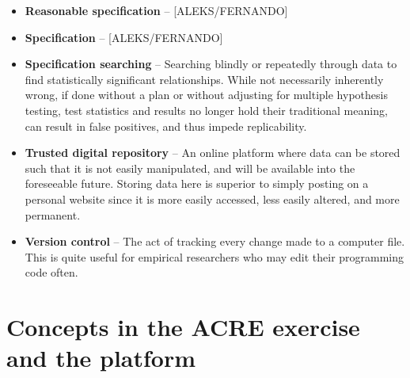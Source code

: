 \documentclass[]{book}
\begin{document}
\begin{itemize}
\item
  \textbf{Reasonable specification} -- {[}ALEKS/FERNANDO{]}
\item
  \textbf{Specification} -- {[}ALEKS/FERNANDO{]}
\item
  \textbf{Specification searching} -- Searching blindly or repeatedly through data to find statistically significant relationships. While not necessarily inherently wrong, if done without a plan or without adjusting for multiple hypothesis testing, test statistics and results no longer hold their traditional meaning, can result in false positives, and thus impede replicability.\\
\item
  \textbf{Trusted digital repository} -- An online platform where data can be stored such that it is not easily manipulated, and will be available into the foreseeable future. Storing data here is superior to simply posting on a personal website since it is more easily accessed, less easily altered, and more permanent.\\
\item
  \textbf{Version control} -- The act of tracking every change made to a computer file. This is quite useful for empirical researchers who may edit their programming code often.
\end{itemize}

\hypertarget{concepts-in-the-acre-exercise-and-the-platform}{%
\section{Concepts in the ACRE exercise and the platform}\label{concepts-in-the-acre-exercise-and-the-platform}}
\end{document}
